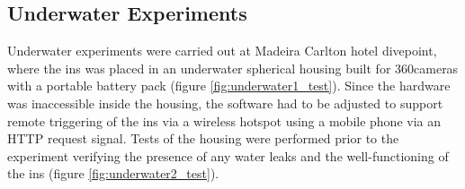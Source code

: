 \newpage

\subsection{Underwater Experiments}

Underwater experiments were carried out at Madeira Carlton hotel divepoint, where the \acrshort{ins} was placed in an underwater spherical housing built for 360\circ cameras with a portable battery pack (figure \ref{fig:underwater1_test}). Since the hardware was inaccessible inside the housing, the software had to be adjusted to support remote triggering of the \acrshort{ins} via a wireless hotspot using a mobile phone via an HTTP request signal. Tests of the housing were performed prior to the experiment verifying the presence of any water leaks and the well-functioning of the \acrshort{ins} (figure \ref{fig:underwater2_test}).

